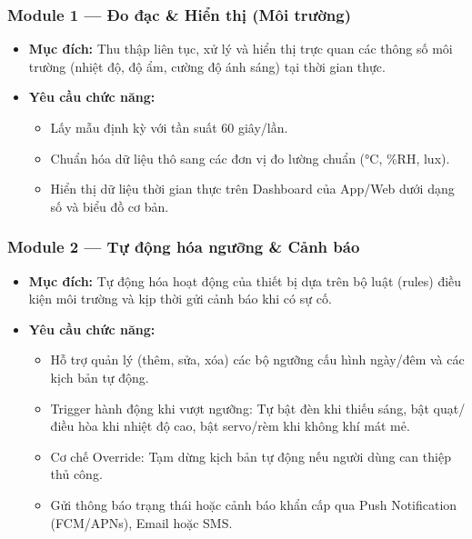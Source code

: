 \subsubsection*{Module 1 — Đo đạc \& Hiển thị (Môi trường)}
\begin{itemize}
  \item \textbf{Mục đích:} Thu thập liên tục, xử lý và hiển thị trực quan các thông số môi trường (nhiệt độ, độ ẩm, cường độ ánh sáng) tại thời gian thực.
  \item \textbf{Yêu cầu chức năng:}
    \begin{itemize}
      \item Lấy mẫu định kỳ với tần suất 60 giây/lần.
      \item Chuẩn hóa dữ liệu thô sang các đơn vị đo lường chuẩn (°C, \%RH, lux).
      \item Hiển thị dữ liệu thời gian thực trên Dashboard của App/Web dưới dạng số và biểu đồ cơ bản.
    \end{itemize}

\end{itemize}

\subsubsection*{Module 2 — Tự động hóa ngưỡng \& Cảnh báo}
\begin{itemize}
  \item \textbf{Mục đích:} Tự động hóa hoạt động của thiết bị dựa trên bộ luật (rules) điều kiện môi trường và kịp thời gửi cảnh báo khi có sự cố.
  \item \textbf{Yêu cầu chức năng:}
    \begin{itemize}
      \item Hỗ trợ quản lý (thêm, sửa, xóa) các bộ ngưỡng cấu hình ngày/đêm và các kịch bản tự động.
      \item Trigger hành động khi vượt ngưỡng: Tự bật đèn khi thiếu sáng, bật quạt/điều hòa khi nhiệt độ cao, bật servo/rèm khi không khí mát mẻ.
      \item Cơ chế Override: Tạm dừng kịch bản tự động nếu người dùng can thiệp thủ công.
      \item Gửi thông báo trạng thái hoặc cảnh báo khẩn cấp qua Push Notification (FCM/APNs), Email hoặc SMS.
    \end{itemize}

\end{itemize}

